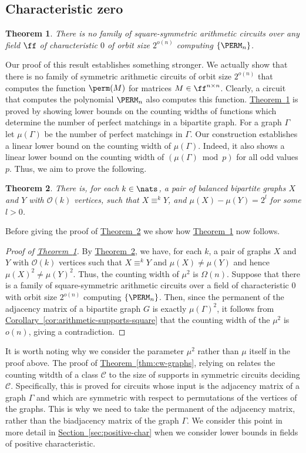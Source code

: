 \documentclass[11pt]{article}
\newcommand{\expref}[2]{\texorpdfstring{\hyperref[#2]{#1~\ref{#2}}}{#1~\ref{#2}}}
\newtheorem{theorem}{Theorem}[section]
\begin{document}
\subsection{Characteristic zero}\label{sec:char-zero}
\begin{theorem}\label{thm:lowerbound-square}
  There is no family of square-symmetric arithmetic circuits over any
  field $\ff$ of
  characteristic $0$ of orbit size $2^{o(n)}$ computing $\{\PERM_n\}$.
\end{theorem}
Our proof of this result establishes something stronger. We actually show that
there is no family of symmetric arithmetic circuits of orbit size $2^{o(n)}$
that computes the function $\perm(M)$ for matrices $M \in \ff^{n \times n}$.
Clearly, a circuit that computes the polynomial $\PERM_n$ also computes this
function. \expref{Theorem}{thm:lowerbound-square} is proved by showing lower bounds on the
counting widths of functions which determine the number of perfect matchings in
a bipartite graph.
For a graph $\Gamma$ let $\mu(\Gamma)$ be the number of perfect matchings in $\Gamma$.  Our construction establishes a linear lower bound on the counting width of $\mu(\Gamma)$.  Indeed, it also shows a linear lower bound on the counting width of $(\mu(\Gamma) \bmod p)$
for all odd values $p$.
Thus, we aim to prove the following.
\begin{theorem}\label{thm:matching}
  There is, for each $k \in \nats$, a pair of balanced bipartite graphs $X$ and
  $Y$ with $\mathcal{O}(k)$ vertices, such that $X \equiv^k Y$, and $\mu(X) -
  \mu(Y) = 2^l$ for some $l >0$.
\end{theorem}
Before giving the proof of \expref{Theorem}{thm:matching} we show how
\expref{Theorem}{thm:lowerbound-square} now follows.
\begin{proof}[Proof of \expref{Theorem}{thm:lowerbound-square}]
  By \expref{Theorem}{thm:matching}, we have, for each $k$, a pair of graphs $X$ and $Y$
  with $\mathcal{O}(k)$ vertices such that  $X
  \equiv^k Y$ and $\mu(X) \neq \mu(Y)$ and hence $\mu(X)^2 \neq \mu(Y)^2$.  Thus, the counting width of $\mu^2$  is $\Omega(n)$.
  Suppose that there is a family of square-symmetric arithmetic circuits over a
  field of characteristic $0$ with orbit size $2^{o(n)}$ computing
  $\{\PERM_n\}$.  Then, since the permanent of the adjacency matrix of a bipartite graph $G$ is exactly $\mu(\Gamma)^2$, it follows from
  \expref{Corollary}{cor:arithmetic-supports-square} that the counting width of the
  $\mu^2$ is $o(n)$, giving a contradiction.
\end{proof}
It is worth noting why we consider the parameter $\mu^2$ rather than $\mu$ itself in the proof above.  The proof of \expref{Theorem}{thm:cw-graphs}, relying on \cite[Theorem 6]{AndersonD17} relates the counting witdth of a class $\mathcal{C}$ to the size of supports in symmetric circuits deciding $\mathcal{C}$.  Specifically, this is proved for circuits whose input is the adjacency matrix of a graph $\Gamma$ and which are symmetric with respect to permutations of the vertices of the graphs.  This is why we need to take the permanent of the adjacency matrix, rather than the biadjacency matrix of the graph $\Gamma$.  We consider this point in more detail in \expref{Section}{sec:positive-char} when we consider lower bounds in fields of positive characteristic.
\end{document}
